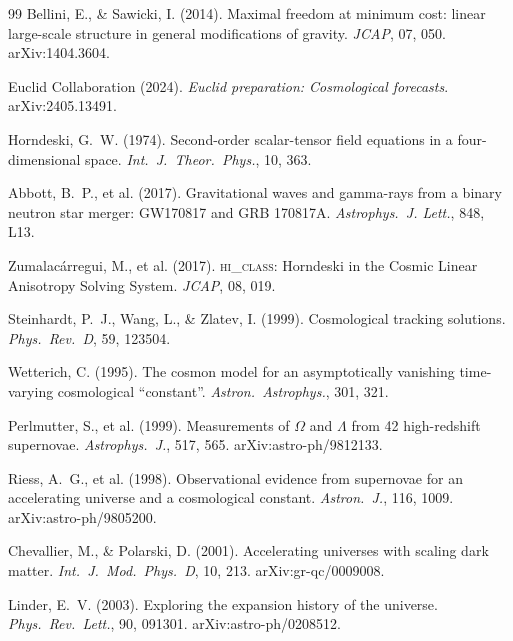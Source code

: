 \documentclass[12pt,a4paper]{article}
\begin{document}
\begin{thebibliography}{99}
  Bellini, E., \& Sawicki, I. (2014).
  Maximal freedom at minimum cost: linear large-scale structure in
  general modifications of gravity.
  \textit{JCAP}, 07, 050. arXiv:1404.3604.

  Euclid Collaboration (2024).
  \textit{Euclid preparation: Cosmological forecasts}.
  arXiv:2405.13491.

  Horndeski, G.~W. (1974).
  Second-order scalar-tensor field equations in a four-dimensional space.
  \textit{Int.\ J.\ Theor.\ Phys.}, 10, 363.

  Abbott, B.~P., et al. (2017).
  Gravitational waves and gamma-rays from a binary neutron star merger:
  GW170817 and GRB 170817A.
  \textit{Astrophys.\ J. Lett.}, 848, L13.

  Zumalacárregui, M., et al. (2017).
  \textsc{hi\_class}: Horndeski in the Cosmic Linear Anisotropy Solving
  System.
  \textit{JCAP}, 08, 019.

  Steinhardt, P.~J., Wang, L., \& Zlatev, I. (1999).
  Cosmological tracking solutions.
  \textit{Phys.\ Rev.\ D}, 59, 123504.

  Wetterich, C. (1995).
  The cosmon model for an asymptotically vanishing time-varying
  cosmological ``constant''.
  \textit{Astron.\ Astrophys.}, 301, 321.

  Perlmutter, S., et al. (1999).
  Measurements of $\Omega$ and $\Lambda$ from 42 high-redshift supernovae.
  \textit{Astrophys.\ J.}, 517, 565.
  arXiv:astro-ph/9812133.

  Riess, A.~G., et al. (1998).
  Observational evidence from supernovae for an accelerating universe and a
  cosmological constant.
  \textit{Astron.\ J.}, 116, 1009.
  arXiv:astro-ph/9805200.

  Chevallier, M., \& Polarski, D. (2001).
  Accelerating universes with scaling dark matter.
  \textit{Int.\ J.\ Mod.\ Phys.\ D}, 10, 213.
  arXiv:gr-qc/0009008.

  Linder, E.~V. (2003).
  Exploring the expansion history of the universe.
  \textit{Phys.\ Rev.\ Lett.}, 90, 091301.
  arXiv:astro-ph/0208512.


\end{thebibliography}
\end{document}
